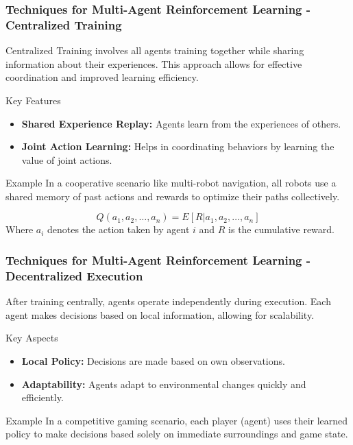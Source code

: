 \documentclass[aspectratio=169]{beamer}
\begin{document}
\begin{frame}[fragile]
    \frametitle{Techniques for Multi-Agent Reinforcement Learning - Centralized Training}
    Centralized Training involves all agents training together while sharing information about their experiences. This approach allows for effective coordination and improved learning efficiency.

    \begin{block}{Key Features}
        \begin{itemize}
            \item \textbf{Shared Experience Replay:} Agents learn from the experiences of others.
            \item \textbf{Joint Action Learning:} Helps in coordinating behaviors by learning the value of joint actions.
        \end{itemize}
    \end{block}
    
    \begin{exampleblock}{Example}
        In a cooperative scenario like multi-robot navigation, all robots use a shared memory of past actions and rewards to optimize their paths collectively.
    \end{exampleblock}
    
    \begin{equation}
        Q(a_1, a_2, \ldots, a_n) = E[R | a_1, a_2, \ldots, a_n]
    \end{equation}
    Where \( a_i \) denotes the action taken by agent \( i \) and \( R \) is the cumulative reward.
\end{frame}

\begin{frame}[fragile]
    \frametitle{Techniques for Multi-Agent Reinforcement Learning - Decentralized Execution}
    After training centrally, agents operate independently during execution. Each agent makes decisions based on local information, allowing for scalability.

    \begin{block}{Key Aspects}
        \begin{itemize}
            \item \textbf{Local Policy:} Decisions are made based on own observations.
            \item \textbf{Adaptability:} Agents adapt to environmental changes quickly and efficiently.
        \end{itemize}
    \end{block}

    \begin{exampleblock}{Example}
        In a competitive gaming scenario, each player (agent) uses their learned policy to make decisions based solely on immediate surroundings and game state.
    \end{exampleblock}
\end{frame}
\end{document}
